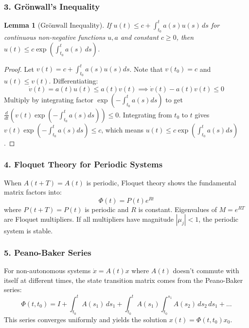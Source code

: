 \documentclass[12pt,a4paper,oneside]{article}
\theoremstyle{definition}
\theoremstyle{plain}
\newtheorem{lemma}[theorem]{Lemma}
\begin{document}
\subsubsection{3. Grönwall's Inequality}

\vspace{0.15cm}
\begin{lemma}[Grönwall Inequality]
If $u(t) \le c + \int_{t_0}^t a(s) u(s) \, ds$ for continuous non-negative functions $u, a$ and constant $c \ge 0$, then $u(t) \le c \exp\left( \int_{t_0}^t a(s) \, ds \right)$.
\end{lemma}

\begin{proof}
Let $v(t) = c + \int_{t_0}^t a(s) u(s) ds$. Note that $v(t_0) = c$ and $u(t) \le v(t)$. Differentiating:
\begin{equation}
    \dot{v}(t) = a(t) u(t) \le a(t) v(t) \implies \dot{v}(t) - a(t) v(t) \le 0
\end{equation}
Multiply by integrating factor $\exp\left(-\int_{t_0}^t a(s) ds\right)$ to get $\frac{d}{dt}\left( v(t) \exp\left( -\int_{t_0}^t a(s) ds \right) \right) \le 0$. Integrating from $t_0$ to $t$ gives $v(t) \exp\left( -\int_{t_0}^t a(s) ds \right) \le c$, which means $u(t) \le c \exp\left( \int_{t_0}^t a(s) ds \right)$.
\end{proof}

\subsubsection{4. Floquet Theory for Periodic Systems}

\vspace{0.15cm}
When $A(t+T) = A(t)$ is periodic, Floquet theory shows the fundamental matrix factors into:
\begin{equation}
    \Phi(t) = P(t) e^{R t}
\end{equation}
where $P(t+T) = P(t)$ is periodic and $R$ is constant. Eigenvalues of $M = e^{RT}$ are Floquet multipliers. If all multipliers have magnitude $|\mu_j| < 1$, the periodic system is stable.

\subsubsection{5. Peano-Baker Series}

\vspace{0.15cm}
For non-autonomous systems $\dot{x} = A(t)x$ where $A(t)$ doesn't commute with itself at different times, the state transition matrix comes from the Peano-Baker series:
\begin{equation}
    \Phi(t, t_0) = I + \int_{t_0}^t A(s_1) \, ds_1 + \int_{t_0}^t A(s_1) \int_{t_0}^{s_1} A(s_2) \, ds_2 \, ds_1 + \dots
\end{equation}
This series converges uniformly and yields the solution $x(t) = \Phi(t, t_0) x_0$.
\end{document}
